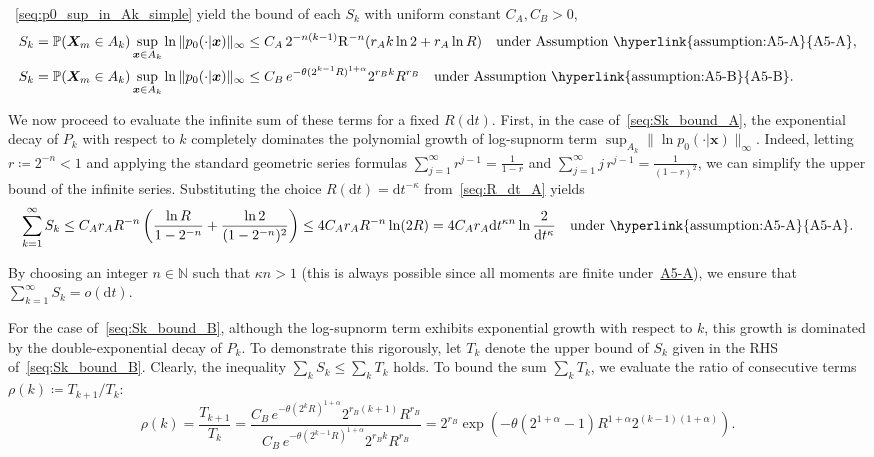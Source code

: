 \documentclass[
 longbibliography,
 twocolumn,
 superscriptaddress,
 amsmath,
 amssymb,
 amsthm,
 amsfonts,
 prl,
 floatfix,
]{revtex4-2}
\begin{document}
\begin{widetext}
~\eqref{seq:p0_sup_in_Ak_simple} yield the bound of each $S_k$ with uniform constant $C_A,C_B>0$,
\begin{subequations}\label{seq:Sk_bound}
\renewcommand{\theequation}{\theparentequation-\Alph{equation}}
\begin{align}
    S_k=\mathbb P(\bm X_m\in A_k)\sup_{\bm x\in A_k}\ln\|p_0(\cdot|\bm x)\|_\infty
    &\leq
    C_A\,2^{-n(k-1)}\mathrm R^{-n}
    (r_Ak\ln2+r_A\ln R)
    \quad\text{under Assumption~\hyperlink{assumption:A5-A}{A5-A}}
    \label{seq:Sk_bound_A},
    \\
    S_k=\mathbb P(\bm X_m\in A_k)\sup_{\bm x\in A_k}\ln\|p_0(\cdot|\bm x)\|_\infty
    &\leq
    C_B\,e^{-\theta (2^{k-1}R)^{1+\alpha}}
    2^{r_Bk}R^{r_B}
    \quad\text{under Assumption~\hyperlink{assumption:A5-B}{A5-B}}.
  \label{seq:Sk_bound_B}
\end{align}
\end{subequations}

We now proceed to evaluate the infinite sum of these terms for a fixed $R(\mathrm dt)$. First, in the case of~\eqref{seq:Sk_bound_A}, the exponential decay of $P_k$ with respect to $k$ completely dominates the polynomial growth of log-supnorm term $\sup_{A_k}\|\ln p_0(\cdot|\bm x)\|_\infty$.
Indeed, letting $r\coloneq2^{-n}<1$ and applying the standard geometric series formulas $\sum_{j=1}^\infty r^{j-1}=\frac{1}{1-r}$ and $\sum_{j=1}^\infty j\,r^{j-1}=\frac{1}{(1-r)^2}$,
we can simplify the upper bound of the infinite series. Substituting the choice $R(\mathrm dt)=\mathrm dt^{-\kappa}$ from~\eqref{seq:R_dt_A} yields
\begin{equation}
    \sum_{k=1}^\infty S_k
    \leq
    C_Ar_A R^{-n}\left(
    \frac{\ln R}{1-2^{-n}}
    +\frac{\ln 2}{(1-2^{-n})^2}\right)
    \leq
    4C_Ar_AR^{-n}\ln(2R)
    =4C_Ar_A\mathrm dt^{\kappa n}
    \ln\frac{2}{\mathrm dt^\kappa}
    \quad\text{under~\hyperlink{assumption:A5-A}{A5-A}}.
    \label{seq:sum_Sk_bound_A}
\end{equation}

By choosing an integer $n\in\mathbb N$ such that $\kappa n>1$ (this is always possible since all moments are finite under~\hyperlink{assumption:A5-A}{A5-A}), we ensure that $\sum_{k=1}^\infty S_k=o(\mathrm dt)$.

For the case of~\eqref{seq:Sk_bound_B}, although the log-supnorm term exhibits exponential growth with respect to $k$, this growth is dominated by the double-exponential decay of $P_k$. To demonstrate this rigorously, let $T_k$ denote the upper bound of $S_k$ given in the RHS of~\eqref{seq:Sk_bound_B}. Clearly, the inequality $\sum_k S_k\leq\sum_k T_k$ holds. To bound the sum $\sum_k T_k$, we evaluate the ratio of consecutive terms $\rho(k)\coloneq T_{k+1}/T_k$:
\begin{equation}
    \rho(k)=
    \frac{T_{k+1}}{T_k}
    =\frac{C_B\,e^{-\theta (2^{k}R)^{1+\alpha}}
    2^{r_B(k+1)}R^{r_B}}
    {C_B\,e^{-\theta (2^{k-1}R)^{1+\alpha}}
    2^{r_Bk}R^{r_B}}
    =2^{r_B}\exp\!\left(
    -\theta(2^{1+\alpha}-1)R^{1+\alpha}2^{(k-1)(1+\alpha)}
    \right).
    \label{seq:rho_k}
\end{equation}


\end{widetext}
\end{document}
